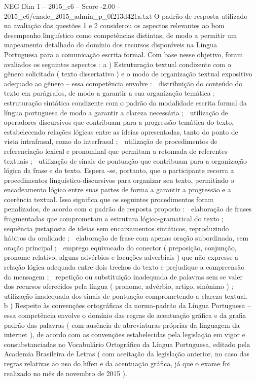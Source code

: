 \begin{textsample}{NEG Dim 1 – 2015\_c6 – Score -2.00 – 2015\_c6/enade\_2015\_admin\_p\_0f213d421a.txt}
O padrão de resposta utilizado na avaliação das questões 1 e 2 considerou os aspectos relevantes ao bom desempenho linguístico como competências distintas, de modo a permitir um mapeamento detalhado do domínio dos recursos disponíveis na Língua Portuguesa para a comunicação escrita formal.
Com base nesse objetivo, foram avaliados os seguintes aspectos : a ) Estruturação textual condizente com o gênero solicitado ( texto dissertativo ) e o modo de organização textual expositivo adequado ao gênero – essa competência envolve :  distribuição do conteúdo do texto em parágrafos, de modo a garantir a sua organização temática ;  estruturação sintática condizente com o padrão da modalidade escrita formal da língua portuguesa de modo a garantir a clareza necessária ;  utilização de operadores discursivos que contribuam para a progressão temática do texto, estabelecendo relações lógicas entre as ideias apresentadas, tanto do ponto de vista intrafrasal, como do interfrasal ;  utilização de procedimentos de referenciação lexical e pronominal que permitam a retomada de referentes textuais ;  utilização de sinais de pontuação que contribuam para a organização lógica da frase e do texto.
Espera -se, portanto, que o participante recorra a procedimentos linguístico-discursivos para organizar seu texto, permitindo o encadeamento lógico entre suas partes de forma a garantir a progressão e a coerência textual.
Isso significa que os seguintes procedimentos foram penalizados, de acordo com o padrão de resposta proposto :  elaboração de frases fragmentadas que comprometam a estrutura lógico-gramatical do texto ;  sequência justaposta de ideias sem encaixamentos sintáticos, reproduzindo hábitos da oralidade ;  elaboração de frase com apenas oração subordinada, sem oração principal ;  emprego equivocado do conector ( preposição, conjunção, pronome relativo, alguns advérbios e locuções adverbiais ) que não expresse a relação lógica adequada entre dois trechos do texto e prejudique a compreensão da mensagem ;  repetição ou substituição inadequada de palavras sem se valer dos recursos oferecidos pela língua ( pronome, advérbio, artigo, sinônimo ) ;  utilização inadequada dos sinais de pontuação comprometendo a clareza textual. b ) Respeito às convenções ortográficas da norma-padrão da Língua Portuguesa – essa competência envolve o domínio das regras de acentuação gráfica e da grafia padrão das palavras ( com ausência de abreviaturas próprias da linguagem da internet ), de acordo com as convenções estabelecidas pela legislação em vigor e consubstanciadas no Vocabulário Ortográfico da Língua Portuguesa, editado pela Academia Brasileira de Letras ( com aceitação da legislação anterior, no caso das regras relativas ao uso do hífen e da acentuação gráfica, já que o exame foi realizado no mês de novembro de 2015 ).

\end{textsample}
